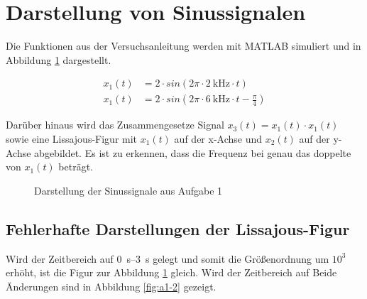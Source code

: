 \documentclass[
    paper=a4,
    fontsize=10pt,
    DIV=calc,
    twocolumn,
    oneside,
]{scrartcl}
\date{\today}
\begin{document}
\maketitle




\section{Darstellung von Sinussignalen}
    Die Funktionen aus der Versuchsanleitung \cite{versuch1} werden mit MATLAB simuliert und in Abbildung \ref{fig:a1} dargestellt.

    \begin{align}
        x_1(t) &= 2 \cdot sin(2\pi \cdot \SI{2}{\kilo\hertz} \cdot t)\\
        x_1(t) &= 2 \cdot sin(2\pi \cdot \SI{6}{\kilo\hertz} \cdot t - \frac{\pi}{4})
    \end{align}

    Darüber hinaus wird das Zusammengesetze Signal \(x_3(t)=x_1(t) \cdot x_1(t)\) sowie eine Lissajous-Figur mit \(x_1(t)\) auf der x-Achse und \(x_2(t)\) auf der y-Achse abgebildet. Es ist zu erkennen, dass die Frequenz bei genau das doppelte von \(x_1(t)\) beträgt.

    \begin{figure}[hbt]
        \centering
        
        \caption{Darstellung der Sinussignale aus Aufgabe 1}
        \label{fig:a1}
    \end{figure}

    \subsection{Fehlerhafte Darstellungen der Lissajous-Figur}
        Wird der Zeitbereich auf \SIrange{0}{3}{\second} gelegt und somit die Größenordnung um \(10^3\) erhöht, ist die Figur zur Abbildung \ref{fig:a1} gleich. Wird der Zeitbereich auf \missing
        Beide Änderungen sind in Abbildung \ref{fig:a1-2} gezeigt.
\end{document}

